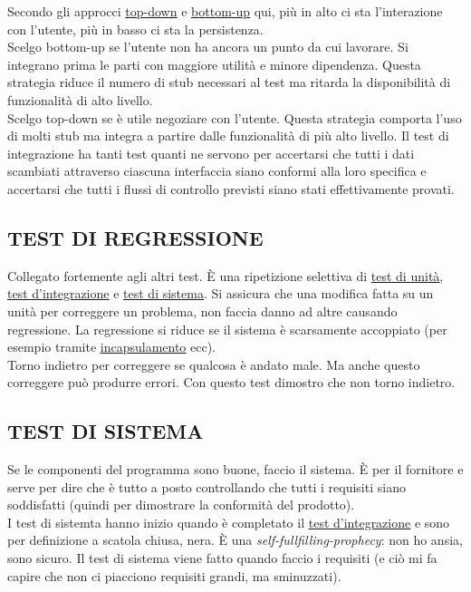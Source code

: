 		Secondo gli approcci \underline{\hyperref[topdown]{top-down}} e \underline{\hyperref[bottomup]{bottom-up}} qui, più in alto ci sta l'interazione con l'utente, più in basso ci sta la persistenza. \\
		Scelgo bottom-up se l'utente non ha ancora un punto da cui lavorare. Si integrano prima le parti con maggiore utilità e minore dipendenza. Questa strategia riduce il numero di stub necessari al test ma ritarda la disponibilità di funzionalità di alto livello. \\
		Scelgo top-down se è utile negoziare con l'utente. Questa strategia comporta l’uso di molti stub ma integra a partire dalle funzionalità di più alto livello. %
		Il test di integrazione ha tanti test quanti ne servono per accertarsi che tutti i dati scambiati attraverso ciascuna interfaccia siano conformi alla loro specifica e accertarsi che tutti i flussi di controllo previsti siano stati effettivamente provati.


		\subsection{TEST DI REGRESSIONE}		\label{testregressione}
		Collegato fortemente agli altri test. È una ripetizione selettiva di \underline{\hyperref[testunita]{test di unità}}, \underline{\hyperref[testintegrazione]{test d'integrazione}} e \underline{\hyperref[testsistema]{test di sistema}}. Si assicura che una modifica fatta su un unità per correggere un problema, non faccia danno ad altre causando regressione. La regressione si riduce se il sistema è scarsamente accoppiato (per esempio tramite \underline{\hyperref[incapsulamento]{incapsulamento}} ecc). \\
		Torno indietro per correggere se qualcosa è andato male. Ma anche questo correggere può produrre errori. Con questo test dimostro che non torno indietro.


		\subsection{TEST DI SISTEMA}		\label{testsistema}
		Se le componenti del programma sono buone, faccio il sistema. È per il fornitore e serve per dire che è tutto a posto controllando che tutti i requisiti siano soddisfatti (quindi per dimostrare la conformità del prodotto).	\\
		I test di sistemta hanno inizio quando è completato il \underline{\hyperref[testintegrazione]{test d'integrazione}} e sono per definizione a scatola chiusa, nera. È una \textit{self-fullfilling-prophecy}: non ho ansia, sono sicuro. Il test di sistema viene fatto quando faccio i requisiti (e ciò mi fa capire che non ci piacciono requisiti grandi, ma sminuzzati).


